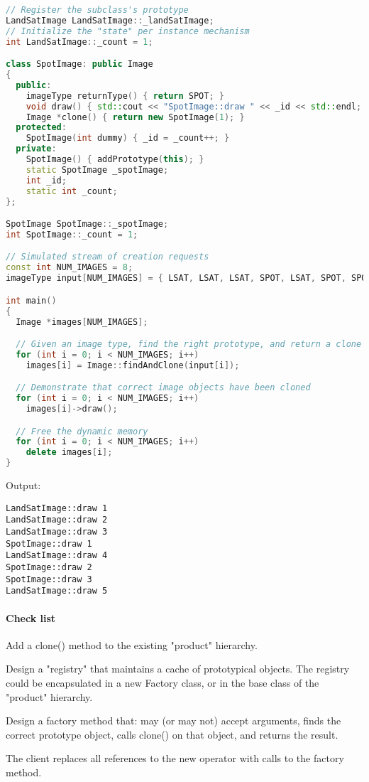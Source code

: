 \documentclass{book}
\begin{document}
\begin{lstlisting}[caption={Prototype Pattern sample 2},language=C++]
// Register the subclass's prototype
LandSatImage LandSatImage::_landSatImage;
// Initialize the "state" per instance mechanism
int LandSatImage::_count = 1;

class SpotImage: public Image
{
  public:
    imageType returnType() { return SPOT; }
    void draw() { std::cout << "SpotImage::draw " << _id << std::endl; }
    Image *clone() { return new SpotImage(1); }
  protected:
    SpotImage(int dummy) { _id = _count++; }
  private:
    SpotImage() { addPrototype(this); }
    static SpotImage _spotImage;
    int _id;
    static int _count;
};

SpotImage SpotImage::_spotImage;
int SpotImage::_count = 1;

// Simulated stream of creation requests
const int NUM_IMAGES = 8;
imageType input[NUM_IMAGES] = { LSAT, LSAT, LSAT, SPOT, LSAT, SPOT, SPOT, LSAT };

int main()
{
  Image *images[NUM_IMAGES];

  // Given an image type, find the right prototype, and return a clone
  for (int i = 0; i < NUM_IMAGES; i++)
    images[i] = Image::findAndClone(input[i]);

  // Demonstrate that correct image objects have been cloned
  for (int i = 0; i < NUM_IMAGES; i++)
    images[i]->draw();

  // Free the dynamic memory
  for (int i = 0; i < NUM_IMAGES; i++)
    delete images[i];
}
\end{lstlisting}
Output:
\begin{verbatim}
LandSatImage::draw 1
LandSatImage::draw 2
LandSatImage::draw 3
SpotImage::draw 1
LandSatImage::draw 4
SpotImage::draw 2
SpotImage::draw 3
LandSatImage::draw 5
\end{verbatim}
\paragraph{Check list}

    Add a clone() method to the existing "product" hierarchy.

    Design a "registry" that maintains a cache of prototypical objects. The registry could be encapsulated in a new Factory class, or in the base class of the "product" hierarchy.

    Design a factory method that: may (or may not) accept arguments, finds the correct prototype object, calls clone() on that object, and returns the result.

    The client replaces all references to the new operator with calls to the factory method.
\end{document}
